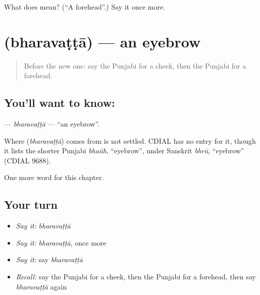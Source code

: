 \begin{tcolorbox}[breakable,colback=teal!4,colframe=teal!35!black,title={Before you move on}]
What does  mean? (\textquotedblleft{}A forehead\textquotedblright{}.) Say it once more.
\end{tcolorbox}
\section[\texorpdfstring{\pa{ਭਰਵੱਟਾ} (bharavaṭṭā)}{ਭਰਵੱਟਾ (bharavaṭṭā)}]{ (bharavaṭṭā) — an eyebrow}

\label{lesson:PA-C134-bharavatta}



\begin{quote}
Before the new one: say the Punjabi for a cheek, then the Punjabi for a forehead.
\end{quote}

\subsection*{You'll want to know: }
\textbf{} — \emph{bharavaṭṭā} — \textquotedblleft{}an eyebrow\textquotedblright{}.

\begin{cousinweb}
Where \textbf{} (\emph{bharavaṭṭā}) comes from is not settled. CDIAL has no entry for it, though it lists the shorter Punjabi \emph{bhaũh}, \textquotedblleft{}eyebrow\textquotedblright{}, under Sanskrit \emph{bhrū}, \textquotedblleft{}eyebrow\textquotedblright{} (CDIAL 9688).
\end{cousinweb}

\begin{grammarlens}[title={What you've built}]
One more word for this chapter.
\end{grammarlens}

\subsection*{Your turn}
\begin{itemize}
\raggedright
  \item \emph{Say it:} \emph{bharavaṭṭā}
  \item \emph{Say it:} \emph{bharavaṭṭā}, once more
  \item \emph{Say it:} say \emph{bharavaṭṭā}
  \item \emph{Recall:} say the Punjabi for a cheek, then the Punjabi for a forehead, then say \emph{bharavaṭṭā} again
\end{itemize}

